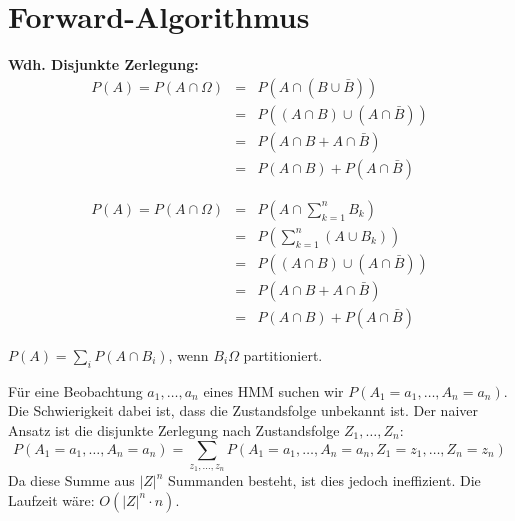 \section{Forward-Algorithmus}
\begin{shaded}
	\noindent
	\textbf{Wdh. Disjunkte Zerlegung:}
	\begin{eqnarray*}
		P(A) = P(A \cap \Omega) &=& P(A \cap (B \cup \bar{B}))\\
								&=& P((A \cap B) \cup (A \cap \bar{B}))\\
								&=& P(A \cap B + A \cap \bar{B})\\
								&=& P(A \cap B)+P(A \cap \bar{B})
	\end{eqnarray*}
	\begin{center}
	\end{center}
	
    \begin{eqnarray*}
        P(A) = P(A \cap \Omega) &=& P(A \cap \sum\limits^n_{k=1} B_k)\\
        &=& P(\sum\limits_{k=1}^n(A \cup B_k))\\
                                &=& P((A \cap B) \cup (A \cap \bar{B}))\\
                                &=& P(A \cap B + A \cap \bar{B})\\
                                &=& P(A \cap B)+P(A \cap \bar{B})
    \end{eqnarray*}
    \begin{center}
	\end{center}
	\(P(A) = \sum_i P(A \cap B_i)\), wenn \(B_i \Omega\) partitioniert.

\end{shaded}
Für eine Beobachtung \(a_1, \dots, a_n\) eines HMM suchen wir \(P(A_1=a_1, \dots, A_n=a_n)\).
Die Schwierigkeit dabei ist, dass die Zustandsfolge unbekannt ist.
Der naiver Ansatz ist die disjunkte Zerlegung nach Zustandsfolge \(Z_1, \dots, Z_n\):
\[P(A_1=a_1, \dots, A_n=a_n) = \sum\limits_{z_1, \dots, z_n} P(A_1=a_1, \dots, A_n=a_n, Z_1=z_1, \dots, Z_n=z_n)\]
Da diese Summe aus \(|Z|^n\) Summanden besteht, ist dies jedoch ineffizient.
Die Laufzeit wäre: $O(|Z|^n\cdot n)$.

